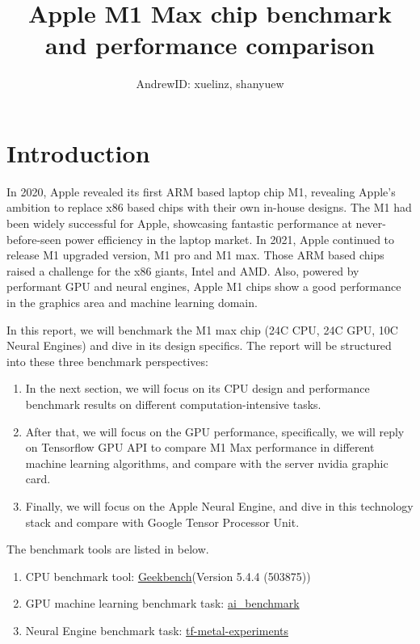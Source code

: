 \documentclass[11pt]{article}
\begin{document}
\title{Apple M1 Max chip benchmark and performance comparison}
\author{AndrewID: xuelinz, shanyuew}
\maketitle

\section{Introduction}
In 2020, Apple revealed its first ARM based laptop chip M1, revealing Apple’s ambition to replace x86 based chips with their own in-house designs. The M1 had been widely successful for Apple, showcasing fantastic performance at never-before-seen power efficiency in the laptop market. In 2021, Apple continued to release M1 upgraded version, M1 pro and M1 max. Those ARM based chips raised a challenge for the x86 giants, Intel and AMD. Also, powered by performant GPU and neural engines, Apple M1 chips show a good performance in the graphics area and machine learning domain.

In this report, we will benchmark the M1 max chip (24C CPU, 24C GPU, 10C Neural Engines) and dive in its design specifics. The report will be structured into these three benchmark perspectives:

\begin{enumerate}
  \item In the next section, we will focus on its CPU design and performance benchmark results on different computation-intensive tasks.
  \item After that, we will focus on the GPU performance, specifically, we will reply on Tensorflow GPU API to compare M1 Max performance in different machine learning algorithms, and compare with the server nvidia graphic card.
  \item Finally, we will focus on the Apple Neural Engine, and dive in this technology stack and compare with Google Tensor Processor Unit.
\end{enumerate}

The benchmark tools are listed in below.

\begin{enumerate}
  \item CPU benchmark tool:
  \href{https://www.geekbench.com/}{Geekbench}(Version 5.4.4 (503875))
  \item GPU machine learning benchmark task: \href{https://pypi.org/project/ai-benchmark/}{ai\_benchmark}
  \item Neural Engine benchmark task: \href{https://github.com/tlkh/tf-metal-experiments}{tf-metal-experiments}
\end{enumerate}
\end{document}
